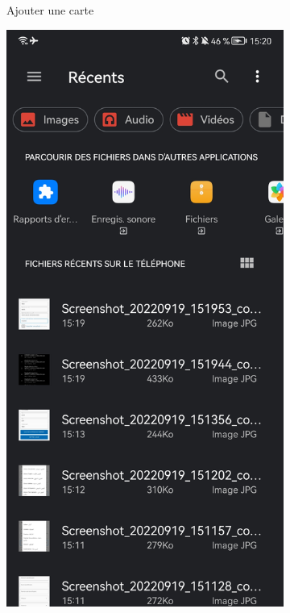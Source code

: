\begin{itemize}[label=$\ast$]
\begin{figure}
\begin{subfigure}[b]{0.3\textwidth}
		\caption{Ajouter une carte}
		\label{fig:three sin x}
	\end{subfigure}
	\hfill
	\begin{subfigure}[b]{0.3\textwidth}
		\centering
		\includegraphics[width=\textwidth]{./Template LaTeX/Images/8.jpg}

\end{subfigure}
\end{figure}
\end{itemize}
